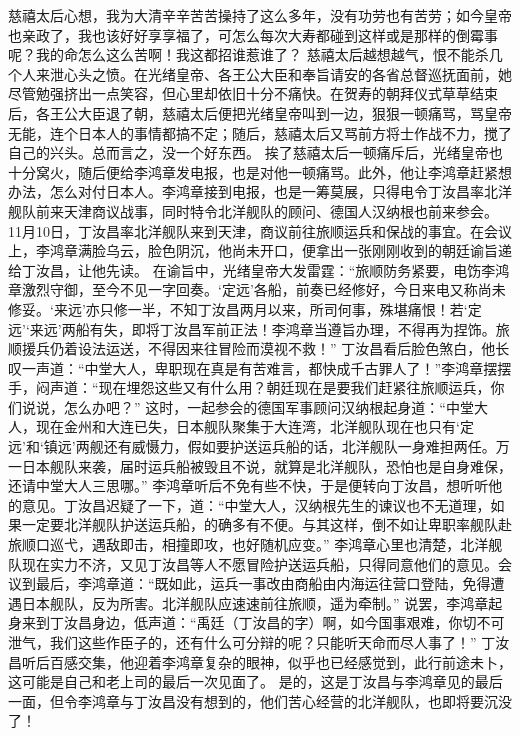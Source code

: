 \documentclass[12pt,UTF8]{ctexbook}
\begin{document}
慈禧太后心想，我为大清辛辛苦苦操持了这么多年，没有功劳也有苦劳；如今皇帝也亲政了，我也该好好享享福了，可怎么每次大寿都碰到这样或是那样的倒霉事呢？我的命怎么这么苦啊！我这都招谁惹谁了？
慈禧太后越想越气，恨不能杀几个人来泄心头之愤。在光绪皇帝、各王公大臣和奉旨请安的各省总督巡抚面前，她尽管勉强挤出一点笑容，但心里却依旧十分不痛快。在贺寿的朝拜仪式草草结束后，各王公大臣退了朝，慈禧太后便把光绪皇帝叫到一边，狠狠一顿痛骂，骂皇帝无能，连个日本人的事情都搞不定；随后，慈禧太后又骂前方将士作战不力，搅了自己的兴头。总而言之，没一个好东西。
挨了慈禧太后一顿痛斥后，光绪皇帝也十分窝火，随后便给李鸿章发电报，也是对他一顿痛骂。此外，他让李鸿章赶紧想办法，怎么对付日本人。李鸿章接到电报，也是一筹莫展，只得电令丁汝昌率北洋舰队前来天津商议战事，同时特令北洋舰队的顾问、德国人汉纳根也前来参会。
11月10日，丁汝昌率北洋舰队来到天津，商议前往旅顺运兵和保战的事宜。在会议上，李鸿章满脸乌云，脸色阴沉，他尚未开口，便拿出一张刚刚收到的朝廷谕旨递给丁汝昌，让他先读。
在谕旨中，光绪皇帝大发雷霆：“旅顺防务紧要，电饬李鸿章激烈守御，至今不见一字回奏。‘定远’各船，前奏已经修好，今日来电又称尚未修妥。‘来远’亦只修一半，不知丁汝昌两月以来，所司何事，殊堪痛恨！若‘定远’‘来远’两船有失，即将丁汝昌军前正法！李鸿章当遵旨办理，不得再为捏饰。旅顺援兵仍着设法运送，不得因来往冒险而漠视不救！”
丁汝昌看后脸色煞白，他长叹一声道：“中堂大人，卑职现在真是有苦难言，都快成千古罪人了！”李鸿章摆摆手，闷声道：“现在埋怨这些又有什么用？朝廷现在是要我们赶紧往旅顺运兵，你们说说，怎么办吧？”
这时，一起参会的德国军事顾问汉纳根起身道：“中堂大人，现在金州和大连已失，日本舰队聚集于大连湾，北洋舰队现在也只有‘定远’和‘镇远’两舰还有威慑力，假如要护送运兵船的话，北洋舰队一身难担两任。万一日本舰队来袭，届时运兵船被毁且不说，就算是北洋舰队，恐怕也是自身难保，还请中堂大人三思哪。”
李鸿章听后不免有些不快，于是便转向丁汝昌，想听听他的意见。丁汝昌迟疑了一下，道：“中堂大人，汉纳根先生的谏议也不无道理，如果一定要北洋舰队护送运兵船，的确多有不便。与其这样，倒不如让卑职率舰队赴旅顺口巡弋，遇敌即击，相撞即攻，也好随机应变。”
李鸿章心里也清楚，北洋舰队现在实力不济，又见丁汝昌等人不愿冒险护送运兵船，只得同意他们的意见。会议到最后，李鸿章道：“既如此，运兵一事改由商船由内海运往营口登陆，免得遭遇日本舰队，反为所害。北洋舰队应速速前往旅顺，遥为牵制。”
说罢，李鸿章起身来到丁汝昌身边，低声道：“禹廷（丁汝昌的字）啊，如今国事艰难，你切不可泄气，我们这些作臣子的，还有什么可分辩的呢？只能听天命而尽人事了！”
丁汝昌听后百感交集，他迎着李鸿章复杂的眼神，似乎也已经感觉到，此行前途未卜，这可能是自己和老上司的最后一次见面了。
是的，这是丁汝昌与李鸿章见的最后一面，但令李鸿章与丁汝昌没有想到的，他们苦心经营的北洋舰队，也即将要沉没了！
\end{document}
